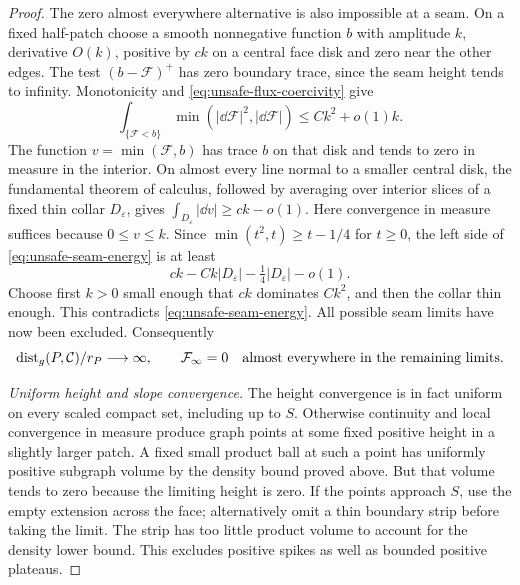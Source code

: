 \begin{proof}
The zero almost everywhere alternative is also impossible at a
seam.  On a fixed half-patch choose a smooth nonnegative function
\(b\) with amplitude \(k\), derivative \(O(k)\), positive by
\(ck\) on a central face disk and zero near the other edges.
The test \((b-\mathcal F)^+\) has zero boundary trace, since the
seam height tends to infinity.  Monotonicity and
\eqref{eq:unsafe-flux-coercivity} give
\begin{equation}
 \int_{\{\mathcal F<b\}}\min(|\dd\mathcal F|^2,
                                      |\dd\mathcal F|)
       \le Ck^2+o(1)k.
 \label{eq:unsafe-seam-energy}
\end{equation}
The function \(v=\min(\mathcal F,b)\) has trace \(b\) on
that disk and tends to zero in measure in the interior.  On almost
every line normal to a smaller central disk, the fundamental
theorem of calculus, followed by averaging over interior slices of
a fixed thin collar \(D_\varepsilon\), gives
\(\int_{D_\varepsilon}|\dd v|\ge ck-o(1)\).  Here convergence
in measure suffices because \(0\le v\le k\).  Since
\(\min(t^2,t)\ge t-1/4\) for \(t\ge0\), the left side of
\eqref{eq:unsafe-seam-energy} is at least
\begin{equation}
 ck-Ck|D_\varepsilon|-\tfrac14|D_\varepsilon|-o(1).
 \label{eq:unsafe-seam-trace-cost}
\end{equation}
Choose first \(k>0\) small enough that \(ck\) dominates
\(Ck^2\), and then the collar thin enough.  This contradicts
\eqref{eq:unsafe-seam-energy}.  All possible seam limits have now
been excluded.  Consequently
\begin{equation}
 \operatorname{dist}_g(P,\mathcal C)/r_P\longrightarrow\infty,
 \qquad \mathcal F_\infty=0
 \quad\hbox{almost everywhere in the remaining limits}.
 \label{eq:unsafe-seam-escape}
\end{equation}

\smallskip\noindent\emph{Uniform height and slope convergence.}
The height convergence is in fact uniform on every scaled compact
set, including up to \(S\).  Otherwise continuity and local
convergence in measure produce graph points at some fixed positive
height in a slightly larger patch.  A fixed small product ball at
such a point has uniformly positive subgraph volume by the density
bound proved above.  But that volume tends to zero because the
limiting height is zero.  If the points approach \(S\), use the
empty extension across the face; alternatively omit a thin boundary
strip before taking the limit.  The strip has too little product
volume to account for the density lower bound.  This excludes
positive spikes as well as bounded positive plateaus.


\end{proof}
